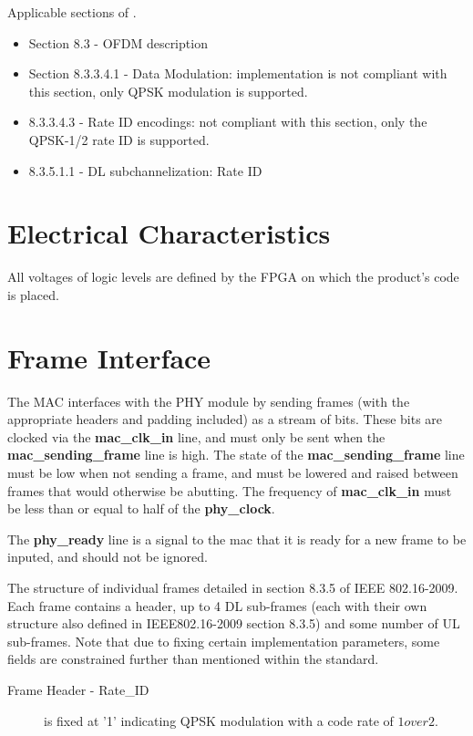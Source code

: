 \documentclass[dvips,10pt,twocolumn]{article}
\begin{document}
	Applicable sections of \cite{IEEE:802.16}.
	\begin{itemize}
		\item Section 8.3 - OFDM description
		\item Section 8.3.3.4.1 - Data Modulation: implementation
			is not compliant with this section, only QPSK
			modulation is supported.
		\item 8.3.3.4.3 - Rate ID encodings: not compliant with
			this section, only the QPSK-1/2 rate ID is supported.
		\item 8.3.5.1.1 - DL subchannelization: Rate ID
	\end{itemize}

\section{Electrical Characteristics}
All voltages of logic levels are defined by the FPGA on which the product's
code is placed.

\section{Frame Interface}
\label{sec:frame}
The MAC interfaces with the PHY module by sending frames (with the
appropriate headers and padding included) as a stream of bits.  These bits
are clocked via the \textbf{mac\_clk\_in} line, and must only be sent when
the \textbf{mac\_sending\_frame} line is high.  The state of the
\textbf{mac\_sending\_frame} line must be low when not sending a frame, and
must be lowered and raised between frames that would otherwise be abutting.
The frequency of \textbf{mac\_clk\_in} must be less than or equal to half
of the \textbf{phy\_clock}.

The \textbf{phy\_ready} line is a signal to the mac that it is ready for a
new frame to be inputed, and should not be ignored.

The structure of individual frames detailed in section 8.3.5 of IEEE
802.16-2009.  Each frame contains a header, up to 4 DL sub-frames (each with
their own structure also defined in IEEE802.16-2009 section 8.3.5) and some
number of UL sub-frames.  Note that due to fixing certain implementation
parameters, some fields are constrained further than mentioned within the
standard.

\begin{description}
	
	\item[Frame Header - Rate\_ID] is fixed at '1' indicating QPSK
		modulation with a code rate of $1 over 2$.
	
	\item[] \end{description}
\end{document}
